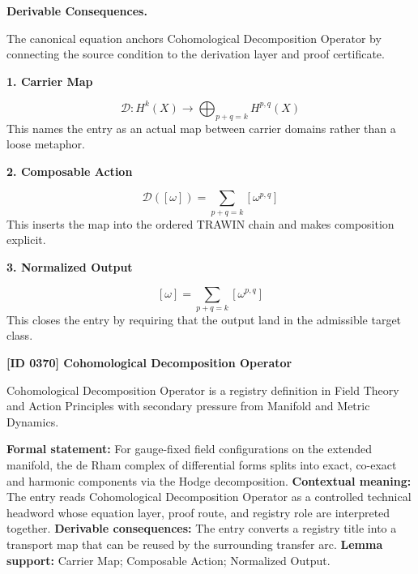 \par\vspace{0.35em}
\noindent\textbf{Derivable Consequences.}\quad
\begingroup
\footnotesize
\raggedright
The canonical equation anchors Cohomological Decomposition Operator by connecting the source condition to the derivation layer and proof certificate.
\par\endgroup

\noindent\textbf{1. Carrier Map}\par
\[
\mathcal{D}:H^{k}(X)\to\bigoplus_{p+q=k}H^{p,q}(X)
\]
\noindent This names the entry as an actual map between carrier domains rather than a loose metaphor.\par
\noindent\textbf{2. Composable Action}\par
\[
\mathcal{D}([\omega])=\sum_{p+q=k}[\omega^{p,q}]
\]
\noindent This inserts the map into the ordered TRAWIN chain and makes composition explicit.\par
\noindent\textbf{3. Normalized Output}\par
\[
[\omega]=\sum_{p+q=k}[\omega^{p,q}]
\]
\noindent This closes the entry by requiring that the output land in the admissible target class.\par

\clearpage
\noindent\textbf{[ID 0370] Cohomological Decomposition Operator}\par
\vspace{0.35em}
\begingroup\small
{}
Cohomological Decomposition Operator is a registry definition in Field Theory and Action Principles with secondary pressure from Manifold and Metric Dynamics.

\begingroup\footnotesize\setlength{\emergencystretch}{3em}\sloppy
\textbf{Formal statement:} For gauge-fixed field configurations on the extended manifold, the de Rham complex of differential forms splits into exact, co-exact and harmonic components via the Hodge decomposition. \textbf{Contextual meaning:} The entry reads Cohomological Decomposition Operator as a controlled technical headword whose equation layer, proof route, and registry role are interpreted together. \textbf{Derivable consequences:} The entry converts a registry title into a transport map that can be reused by the surrounding transfer arc. \textbf{Lemma support:} Carrier Map; Composable Action; Normalized Output.\par
\endgroup

